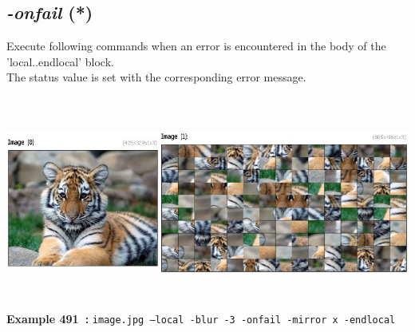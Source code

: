 \documentclass[a4paper,11pt,twoside]{book}
\begin{document}
\subsection{\emph{-onfail} (*)}\vspace*{-0.5em}
Execute following commands when an error is encountered in the body of the 'local..endlocal' block.
~\\The status value is set with the corresponding error message.
\begin{center}\includegraphics[keepaspectratio=true,height=7cm,width=\textwidth]{img/gmic_def491.jpg}\\
{\footnotesize \textbf{Example 491~:} \texttt{image.jpg --local -blur -3 -onfail -mirror x -endlocal}}
\end{center}
\end{document}
